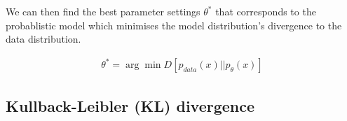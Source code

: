 \documentclass[11pt]{article}
\begin{document}
\begin{figure}[H]
    \centering
\end{figure}

We can then find the best parameter settings $\theta^*$ that corresponds to the probablistic model which minimises the model distribution's divergence to the data distribution.

\begin{gather}
    \theta^* = \arg \min D[p_{data}(x) || p_\theta(x)]
\end{gather}

\subsection{Kullback-Leibler (KL) divergence}\label{sect:Kullback-Leibler (KL) divergence}
\end{document}
